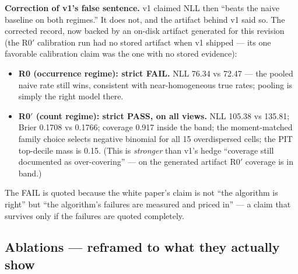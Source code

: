\documentclass[11pt]{article}
\begin{document}
\textbf{Correction of v1's false sentence.} v1 claimed NLL then ``beats the
naive baseline on both regimes.'' It does not, and the artifact behind v1
said so. The corrected record, now backed by an on-disk artifact generated
for this revision (the R0$'$ calibration run had no stored artifact when v1
shipped --- its one favorable calibration claim was the one with no stored
evidence):

\begin{itemize}[leftmargin=1.4em]
\item \textbf{R0 (occurrence regime): strict FAIL.} NLL 76.34 vs 72.47 ---
  the pooled naive rate still wins, consistent with near-homogeneous true
  rates; pooling is simply the right model there.
\item \textbf{R0$'$ (count regime): strict PASS, on all views.} NLL 105.38
  vs 135.81; Brier 0.1708 vs 0.1766; coverage 0.917 inside the band; the
  moment-matched family choice selects negative binomial for all 15
  overdispersed cells; the PIT top-decile mass is 0.15. (This is
  \emph{stronger} than v1's hedge ``coverage still documented as
  over-covering'' --- on the generated artifact R0$'$ coverage is in band.)
\end{itemize}

The FAIL is quoted because the white paper's claim is not ``the algorithm is
right'' but ``the algorithm's failures are measured and priced in'' --- a
claim that survives only if the failures are quoted completely.

\subsection{Ablations --- reframed to what they actually show}
\label{sec:ablations}
\end{document}
